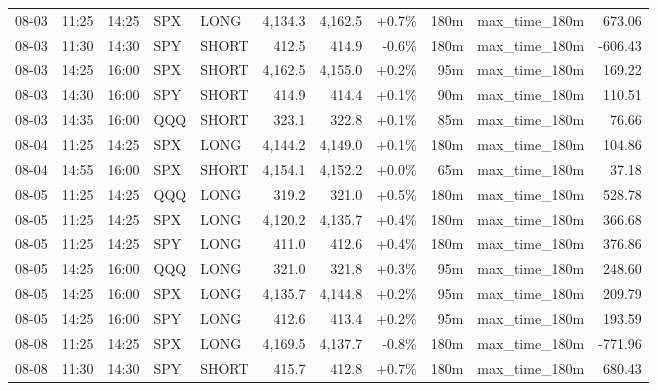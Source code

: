 \documentclass[11pt,a4paper,twoside]{article}
\begin{document}
\begin{center}
\begin{longtable}{>{\color{txtmain}}l l l l l r r r r >{\color{txtmain}}l r}
08-03 & 11:25 & 14:25 & SPX & LONG & 4,134.3 & 4,162.5 & \textcolor{wingreen}{+0.7\%} & 180m & max\_time\_180m & \textcolor{wingreen}{673.06} \\
08-03 & 11:30 & 14:30 & SPY & SHORT & 412.5 & 414.9 & \textcolor{lossred}{-0.6\%} & 180m & max\_time\_180m & \textcolor{lossred}{-606.43} \\
08-03 & 14:25 & 16:00 & SPX & SHORT & 4,162.5 & 4,155.0 & \textcolor{wingreen}{+0.2\%} & 95m & max\_time\_180m & \textcolor{wingreen}{169.22} \\
08-03 & 14:30 & 16:00 & SPY & SHORT & 414.9 & 414.4 & \textcolor{wingreen}{+0.1\%} & 90m & max\_time\_180m & \textcolor{wingreen}{110.51} \\
08-03 & 14:35 & 16:00 & QQQ & SHORT & 323.1 & 322.8 & \textcolor{wingreen}{+0.1\%} & 85m & max\_time\_180m & \textcolor{wingreen}{76.66} \\
08-04 & 11:25 & 14:25 & SPX & LONG & 4,144.2 & 4,149.0 & \textcolor{wingreen}{+0.1\%} & 180m & max\_time\_180m & \textcolor{wingreen}{104.86} \\
08-04 & 14:55 & 16:00 & SPX & SHORT & 4,154.1 & 4,152.2 & \textcolor{wingreen}{+0.0\%} & 65m & max\_time\_180m & \textcolor{wingreen}{37.18} \\
08-05 & 11:25 & 14:25 & QQQ & LONG & 319.2 & 321.0 & \textcolor{wingreen}{+0.5\%} & 180m & max\_time\_180m & \textcolor{wingreen}{528.78} \\
08-05 & 11:25 & 14:25 & SPX & LONG & 4,120.2 & 4,135.7 & \textcolor{wingreen}{+0.4\%} & 180m & max\_time\_180m & \textcolor{wingreen}{366.68} \\
08-05 & 11:25 & 14:25 & SPY & LONG & 411.0 & 412.6 & \textcolor{wingreen}{+0.4\%} & 180m & max\_time\_180m & \textcolor{wingreen}{376.86} \\
08-05 & 14:25 & 16:00 & QQQ & LONG & 321.0 & 321.8 & \textcolor{wingreen}{+0.3\%} & 95m & max\_time\_180m & \textcolor{wingreen}{248.60} \\
08-05 & 14:25 & 16:00 & SPX & LONG & 4,135.7 & 4,144.8 & \textcolor{wingreen}{+0.2\%} & 95m & max\_time\_180m & \textcolor{wingreen}{209.79} \\
08-05 & 14:25 & 16:00 & SPY & LONG & 412.6 & 413.4 & \textcolor{wingreen}{+0.2\%} & 95m & max\_time\_180m & \textcolor{wingreen}{193.59} \\
08-08 & 11:25 & 14:25 & SPX & LONG & 4,169.5 & 4,137.7 & \textcolor{lossred}{-0.8\%} & 180m & max\_time\_180m & \textcolor{lossred}{-771.96} \\
08-08 & 11:30 & 14:30 & SPY & SHORT & 415.7 & 412.8 & \textcolor{wingreen}{+0.7\%} & 180m & max\_time\_180m & \textcolor{wingreen}{680.43} \\

\end{longtable}
\end{center}
\end{document}
